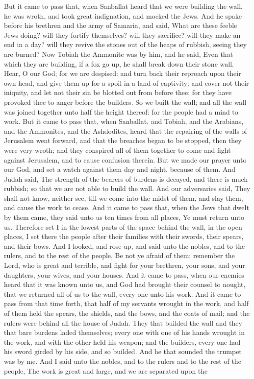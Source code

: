 But it came to pass that, when Sanballat heard that we were building the wall, he was wroth, and took great indignation, and mocked the Jews. And he spake before his brethren and the army of Samaria, and said, What are these feeble Jews doing? will they fortify themselves? will they sacrifice? will they make an end in a day? will they revive the stones out of the heaps of rubbish, seeing they are burned? Now Tobiah the Ammonite was by him, and he said, Even that which they are building, if a fox go up, he shall break down their stone wall. Hear, O our God; for we are despised: and turn back their reproach upon their own head, and give them up for a spoil in a land of captivity; and cover not their iniquity, and let not their sin be blotted out from before thee; for they have provoked thee to anger before the builders. So we built the wall; and all the wall was joined together unto half the height thereof: for the people had a mind to work.  But it came to pass that, when Sanballat, and Tobiah, and the Arabians, and the Ammonites, and the Ashdodites, heard that the repairing of the walls of Jerusalem went forward, and that the breaches began to be stopped, then they were very wroth; and they conspired all of them together to come and fight against Jerusalem, and to cause confusion therein. But we made our prayer unto our God, and set a watch against them day and night, because of them. And Judah said, The strength of the bearers of burdens is decayed, and there is much rubbish; so that we are not able to build the wall. And our adversaries said, They shall not know, neither see, till we come into the midst of them, and slay them, and cause the work to cease. And it came to pass that, when the Jews that dwelt by them came, they said unto us ten times from all places, Ye must return unto us. Therefore set I in the lowest parts of the space behind the wall, in the open places, I set there the people after their families with their swords, their spears, and their bows. And I looked, and rose up, and said unto the nobles, and to the rulers, and to the rest of the people, Be not ye afraid of them: remember the Lord, who is great and terrible, and fight for your brethren, your sons, and your daughters, your wives, and your houses.  And it came to pass, when our enemies heard that it was known unto us, and God had brought their counsel to nought, that we returned all of us to the wall, every one unto his work. And it came to pass from that time forth, that half of my servants wrought in the work, and half of them held the spears, the shields, and the bows, and the coats of mail; and the rulers were behind all the house of Judah. They that builded the wall and they that bare burdens laded themselves; every one with one of his hands wrought in the work, and with the other held his weapon; and the builders, every one had his sword girded by his side, and so builded. And he that sounded the trumpet was by me. And I said unto the nobles, and to the rulers and to the rest of the people, The work is great and large, and we are separated upon the 